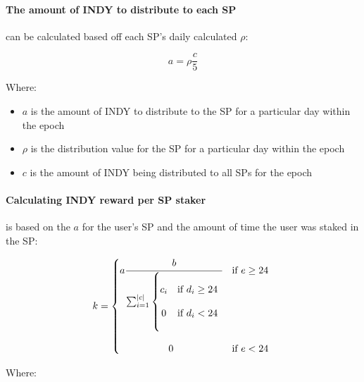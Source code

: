 \documentclass{article}
\begin{document}
\begin{sloppypar}
\hypertarget{the-amount-of-indy-to-distribute-to-each-sp}{%
\paragraph{The amount of INDY to distribute to each
SP}\label{the-amount-of-indy-to-distribute-to-each-sp}}

can be calculated based off each SP's daily calculated \(\rho\):

\[a = \rho\frac{c}{5}\]

Where:

\begin{itemize}
\item
  \(a\) is the amount of INDY to distribute to the SP for a particular
  day within the epoch
\item
  \(\rho\) is the distribution value for the SP for a particular day
  within the epoch
\item
  \(c\) is the amount of INDY being distributed to all SPs for the epoch
\end{itemize}

\filbreak

\hypertarget{calculating-indy-reward-per-sp-staker}{%
\paragraph{Calculating INDY reward per SP
staker}\label{calculating-indy-reward-per-sp-staker}}

is based on the \(a\) for the user's SP and the amount of time the user
was staked in the SP:

\[k = \left\{ \begin{matrix}
  a \cfrac{b}{\sum_{i = 1}^{\left| c \right|}\left\{ \begin{matrix}
    \\
    c_{i} & \text{if\ }d_{i} \geq 24 \\ \\
    0 & \text{if\ }d_{i} < 24 \\ \\
    \end{matrix} \right.\ } & \text{if\ }e \geq 24 \\ \\
  0 & \text{if\ }e < 24 \\
  \end{matrix} \right.\ \]

Where:


\end{sloppypar}
\end{document}
